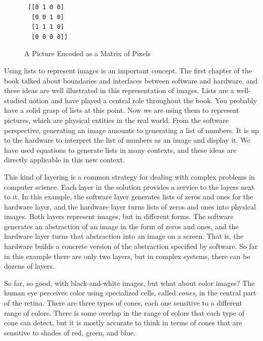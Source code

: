 \begin{figure}
\begin{center}
\begin{minipage}{3cm}
\begin{verbatim}
 [[0 1 0 0]
  [0 0 1 0]
  [1 1 1 0]
  [0 0 0 0]]
\end{verbatim}
\end{minipage}%
\begin{minipage}{3cm}
\end{minipage}
\end{center}
\caption{A Picture Encoded as a Matrix of Pixels}
\label{fig:glider-in-images}
\end{figure}

Using lists to represent images is an important concept.
The first chapter of the book talked about boundaries
and interfaces between software and hardware, and these ideas are
well illustrated in this representation of images. 
Lists are a well-studied notion and have played a central
role throughout the book. 
You probably have a solid grasp of lists at this point.
Now we are using them to represent pictures, which are
physical entities in the real world.
From the software perspective,
generating an image amounts to generating a list of numbers.
It is up to the hardware to interpret the list of numbers
as an image and display it.
We have used equations to generate lists in many contexts,
and these ideas are directly applicable in this new context.

This kind of layering is a common strategy for dealing
with complex problems in computer science.
Each layer in the solution provides a service
to the layers next to it. In this example, 
the software layer generates lists of zeros and ones
for the hardware layer, and
the hardware layer turns lists of zeros and ones into physical images.
Both layers represent images, but in different forms.
The software generates an abstraction of an image
in the form of zeros and ones,
and the hardware layer turns that abstraction into an
image on a screen. That is, the hardware builds a 
concrete version of the abstraction specified by software.
So far in this example there are only two layers, 
but in complex systems, there can be dozens of layers.

So far, so good, with black-and-white images,
but what about color images? 
The human eye perceives
color using specialized cells, called \emph{cones}, in the central
part of the retina. There are three types of cones, each one sensitive
to a different range of colors. There is some overlap in the range
of colors that each type of cone can detect, but it is mostly accurate
to think in terms of cones that are sensitive to shades of red, green,
and blue.


